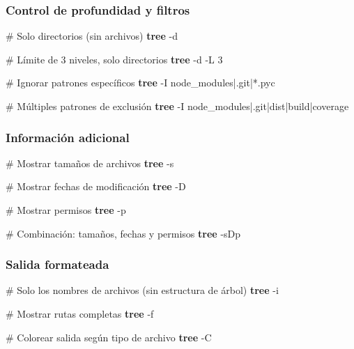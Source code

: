 \documentclass[
  11pt,
  letterpaper,
  oneside,
  openany]{scrbook}
\newenvironment{Shaded}{}{}
\newcommand{\AttributeTok}[1]{\textcolor[rgb]{0.84,0.23,0.29}{#1}}
\newcommand{\CommentTok}[1]{\textcolor[rgb]{0.42,0.45,0.49}{#1}}
\newcommand{\ExtensionTok}[1]{\textcolor[rgb]{0.84,0.23,0.29}{\textbf{#1}}}
\newcommand{\NormalTok}[1]{\textcolor[rgb]{0.14,0.16,0.18}{#1}}
\newcommand{\StringTok}[1]{\textcolor[rgb]{0.01,0.18,0.38}{#1}}
\begin{document}
\subsubsection{Control de profundidad y
filtros}\label{control-de-profundidad-y-filtros}

\begin{Shaded}
\begin{Highlighting}[]
\CommentTok{\# Solo directorios (sin archivos)}
\ExtensionTok{tree} \AttributeTok{{-}d}

\CommentTok{\# Límite de 3 niveles, solo directorios}
\ExtensionTok{tree} \AttributeTok{{-}d} \AttributeTok{{-}L}\NormalTok{ 3}

\CommentTok{\# Ignorar patrones específicos}
\ExtensionTok{tree} \AttributeTok{{-}I} \StringTok{\textquotesingle{}node\_modules|.git|*.pyc\textquotesingle{}}

\CommentTok{\# Múltiples patrones de exclusión}
\ExtensionTok{tree} \AttributeTok{{-}I} \StringTok{\textquotesingle{}node\_modules|.git|dist|build|coverage\textquotesingle{}}
\end{Highlighting}
\end{Shaded}

\subsubsection{Información adicional}\label{informaciuxf3n-adicional}

\begin{Shaded}
\begin{Highlighting}[]
\CommentTok{\# Mostrar tamaños de archivos}
\ExtensionTok{tree} \AttributeTok{{-}s}

\CommentTok{\# Mostrar fechas de modificación}
\ExtensionTok{tree} \AttributeTok{{-}D}

\CommentTok{\# Mostrar permisos}
\ExtensionTok{tree} \AttributeTok{{-}p}

\CommentTok{\# Combinación: tamaños, fechas y permisos}
\ExtensionTok{tree} \AttributeTok{{-}sDp}
\end{Highlighting}
\end{Shaded}

\subsubsection{Salida formateada}\label{salida-formateada}

\begin{Shaded}
\begin{Highlighting}[]
\CommentTok{\# Solo los nombres de archivos (sin estructura de árbol)}
\ExtensionTok{tree} \AttributeTok{{-}i}

\CommentTok{\# Mostrar rutas completas}
\ExtensionTok{tree} \AttributeTok{{-}f}

\CommentTok{\# Colorear salida según tipo de archivo}
\ExtensionTok{tree} \AttributeTok{{-}C}
\end{Highlighting}
\end{Shaded}
\end{document}
